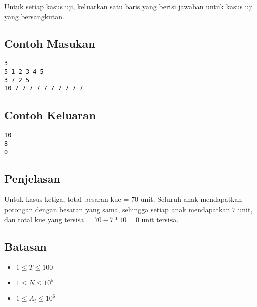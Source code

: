 \documentclass{article}
\begin{document}
\par Untuk setiap kasus uji, keluarkan satu baris yang berisi jawaban untuk kasus uji yang bersangkutan.

\subsection*{Contoh Masukan}

\begin{lstlisting}
3
5 1 2 3 4 5
3 7 2 5
10 7 7 7 7 7 7 7 7 7 7
\end{lstlisting}

\subsection*{Contoh Keluaran}

\begin{lstlisting}
10
8
0
\end{lstlisting}

\subsection*{Penjelasan}

Untuk kasus ketiga, total besaran kue = $70$ unit. Seluruh anak mendapatkan potongan dengan besaran yang sama, sehingga setiap anak mendapatkan $7$ unit, dan total kue yang tersisa = $70 - 7 * 10 = 0$ unit tersisa.

\subsection*{Batasan}

\begin{itemize}
	\item $1 \leq T\leq 100$
	\item $1 \leq N\leq 10^5$
	\item $1 \leq A_i\leq 10^6$
\end{itemize}
\end{document}
